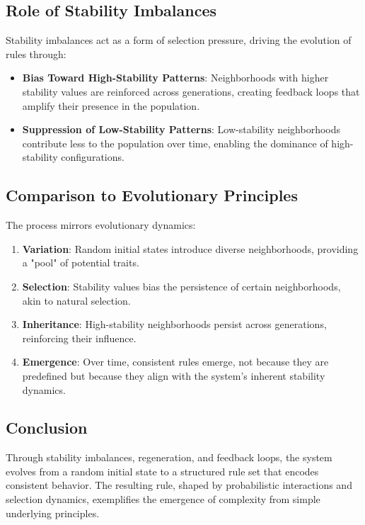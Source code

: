 \documentclass[entropy,article,submit,pdftex,moreauthors]{Definitions/mdpi}
\begin{document}
\subsection{Role of Stability Imbalances}

Stability imbalances act as a form of selection pressure, driving the evolution of rules through:
\begin{itemize}
    \item \textbf{Bias Toward High-Stability Patterns}: Neighborhoods with higher stability values are reinforced across generations, creating feedback loops that amplify their presence in the population.
    \item \textbf{Suppression of Low-Stability Patterns}: Low-stability neighborhoods contribute less to the population over time, enabling the dominance of high-stability configurations.
\end{itemize}

\subsection{Comparison to Evolutionary Principles}

The process mirrors evolutionary dynamics:
\begin{enumerate}
    \item \textbf{Variation}: Random initial states introduce diverse neighborhoods, providing a "pool" of potential traits.
    \item \textbf{Selection}: Stability values bias the persistence of certain neighborhoods, akin to natural selection.
    \item \textbf{Inheritance}: High-stability neighborhoods persist across generations, reinforcing their influence.
    \item \textbf{Emergence}: Over time, consistent rules emerge, not because they are predefined but because they align with the system's inherent stability dynamics.
\end{enumerate}

\subsection{Conclusion}

Through stability imbalances, regeneration, and feedback loops, the system evolves from a random initial state to a structured rule set that encodes consistent behavior. The resulting rule, shaped by probabilistic interactions and selection dynamics, exemplifies the emergence of complexity from simple underlying principles.
\end{document}
